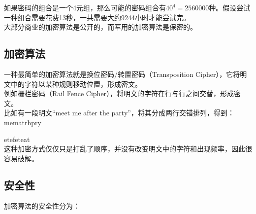 如果密码的组合是一个4元组，那么可能的密码组合有$ 40^4 = 2560000 $种。假设尝试一种组合需要花费13秒，一共需要大约9244小时才能尝试完。\\

大部分商业的加密算法是公开的，而军用的加密算法是保密的。\\

\subsection{加密算法}

一种最简单的加密算法就是换位密码/转置密码（Transposition Cipher），它将明文中的字符以某种规则移动位置，形成密文。\\

例如栅栏密码（Rail Fence Cipher），将明文的字符在行与行之间交替，形成密文。\\

比如有一段明文“meet me after the party”，将其分成两行交错排列，得到：\\

m\hspace{0.3cm}e\hspace{0.3cm}m\hspace{0.3cm}a\hspace{0.3cm}t\hspace{0.3cm}r\hspace{0.3cm}h\hspace{0.3cm}p\hspace{0.3cm}r\hspace{0.3cm}y

\hspace{0.4cm}e\hspace{0.4cm}t\hspace{0.4cm}e\hspace{0.3cm}f\hspace{0.4cm}e\hspace{0.3cm}t\hspace{0.3cm}e\hspace{0.3cm}a\hspace{0.3cm}t\\

这种加密方式仅仅只是打乱了顺序，并没有改变明文中的字符和出现频率，因此很容易破解。\\

\subsection{安全性}

加密算法的安全性分为：

